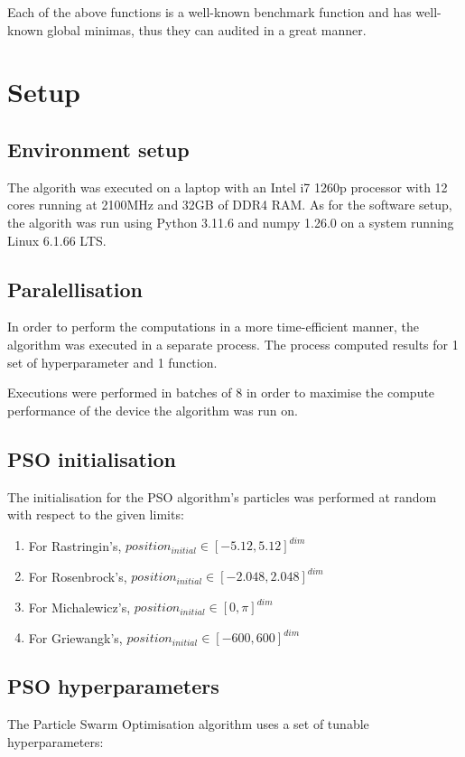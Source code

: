 \documentclass[conference]{IEEEtran}
\begin{document}
Each of the above functions is a well-known benchmark function and has well-known global minimas, thus they can audited
in a great manner.

\section{Setup}

\subsection{Environment setup}
The algorith was executed on a laptop with an Intel i7 1260p processor with 12 cores running at 2100MHz and 32GB of DDR4 RAM.
As for the software setup, the algorith was run using Python 3.11.6 and numpy 1.26.0 on a system running Linux 6.1.66 LTS.

\subsection{Paralellisation}
In order to perform the computations in a more time-efficient manner, the algorithm was executed in a separate process.
The process computed results for 1 set of hyperparameter and 1 function.

Executions were performed in batches of 8 in order to maximise the compute performance of the device the algorithm was run on.

\subsection{PSO initialisation}
The initialisation for the PSO algorithm's particles was performed at random with respect to the given limits:

\begin{enumerate}
    \item For Rastringin's, $position_{initial} \in [-5.12, 5.12]^{dim}$
    \item For Rosenbrock's, $position_{initial} \in [-2.048, 2.048]^{dim}$
    \item For Michalewicz's, $position_{initial} \in [0, \pi]^{dim}$
    \item For Griewangk's, $position_{initial} \in [-600, 600]^{dim}$
\end{enumerate}

\subsection{PSO hyperparameters}
The Particle Swarm Optimisation algorithm uses a set of tunable hyperparameters:
\end{document}
